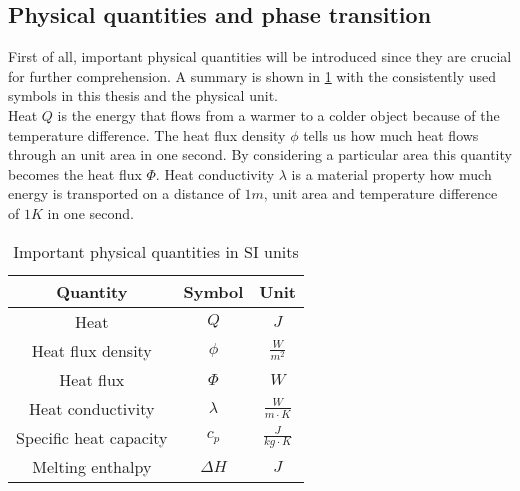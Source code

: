\documentclass{scrartcl}[12pt, halfparskip]
\numberwithin{equation}{section}
\numberwithin{figure}{section}
\numberwithin{table}{section}
\begin{document}
\subsection{Physical quantities and phase transition}

First of all, important physical quantities will be introduced since they are crucial for further comprehension. A summary is shown in \cref{tab:important_physical_quantities} with the consistently used symbols in this thesis and the physical unit. \\
Heat $Q$ is the energy that flows from a warmer to a colder object because of the temperature difference. The heat flux density $\phi$ tells us how much heat flows through an unit area in one second. By considering a particular area this quantity becomes the heat flux $\varPhi$. Heat conductivity $\lambda$ is a material property how much energy is transported on a distance of $1m$, unit area and temperature difference of $1K$ in one second.

\begin{table}
	\centering
	\caption{Important physical quantities in SI units}
	\begin{tabular}{| c | c | c |} \hline
		Quantity & Symbol & Unit \\ \hline
		Heat & $Q$ & $J$ \\[0.7ex]
		Heat flux density & $\phi$ & $\frac{W}{m^2}$ \\[0.7ex]
		Heat flux & $\varPhi$ & $W$ \\[0.7ex]
		Heat conductivity & $\lambda$ & $\frac{W}{m \cdot K}$ \\[0.7ex]
		Specific heat capacity & $c_p$ & $\frac{J}{kg \cdot K}$ \\[0.7ex]
		Melting enthalpy & $\Delta H$ & $J$ \\ \hline
	\end{tabular}
\label{tab:important_physical_quantities}
\end{table}
\end{document}
